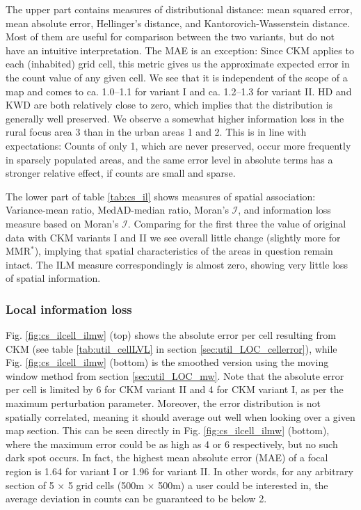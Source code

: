 The upper part contains measures of distributional distance: mean squared error, mean absolute error, Hellinger's distance, and Kantorovich-Wasserstein distance. Most of them are useful for comparison between the two variants, but do not have an intuitive interpretation. The MAE is an exception: Since CKM applies to each (inhabited) grid cell, this metric gives us the approximate expected error in the count value of any given cell. We see that it is independent of the scope of a map and comes to ca. 1.0--1.1 for variant I and ca. 1.2--1.3 for variant II. HD and KWD are both relatively close to zero, which implies that the distribution is generally well preserved. We observe a somewhat higher information loss in the rural focus area 3 than in the urban areas 1 and 2. This is in line with expectations: Counts of only 1, which are never preserved, occur more frequently in sparsely populated areas, and the same error level in absolute terms has a stronger relative effect, if counts are small and sparse.

The lower part of table \ref{tab:cs_il} shows measures of spatial association: Variance-mean ratio, MedAD-median ratio, Moran's $\mathcal{I}$, and information loss measure based on Moran's $\mathcal{I}$. Comparing for the first three the value of original data with CKM variants I and II we see overall little change (slightly more for MMR$^*$), implying that spatial characteristics of the areas in question remain intact. The ILM measure correspondingly is almost zero, showing very little loss of spatial information.

\subsubsection{Local information loss}

Fig. \ref{fig:cs_ilcell_ilmw} (top) shows the absolute error per cell resulting from CKM (see table \ref{tab:util_cellLVL} in section \ref{sec:util_LOC_cellerror}), while Fig. \ref{fig:cs_ilcell_ilmw} (bottom) is the smoothed version using the moving window method from section \ref{sec:util_LOC_mw}. Note that the absolute error per cell is limited by 6 for CKM variant II and 4 for CKM variant I, as per the maximum perturbation parameter. Moreover, the error distribution is not spatially correlated, meaning it should average out well when looking over a given map section. This can be seen directly in Fig. \ref{fig:cs_ilcell_ilmw} (bottom), where the maximum error could be as high as 4 or 6 respectively, but no such dark spot occurs. In fact, the highest mean absolute error (MAE) of a focal region is 1.64 for variant I or 1.96 for variant II. In other words, for any arbitrary section of 5 $\times$ 5 grid cells (500m $\times$ 500m) a user could be interested in, the average deviation in counts can be guaranteed to be below 2.

